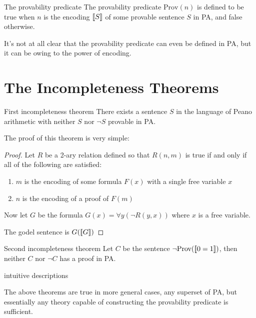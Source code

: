 \documentclass[12pt]{article}
\DeclarePairedDelimiter{\enc}{[\![}{]\!]}
\newcommand{\prov}{\text{Prov}}
\begin{document}
	\begin{definition}{The provability predicate}{}
		The provability predicate $\prov(n)$ is defined to be true when $n$ is the encoding $\enc{S}$ of some provable sentence $S$ in PA, and false otherwise.
	\end{definition}
	
	It's not at all clear that the provability predicate can even be defined in PA, but it can be owing to the power of encoding.
	
	\section{The Incompleteness Theorems}
	
	\begin{theorem}{First incompleteness theorem}{}
		There exists a sentence $S$ in the language of Peano arithmetic with neither $S$ nor $\lnot S$ provable in PA.
	\end{theorem}

	The proof of this theorem is very simple:
	
	\begin{proof}
		Let $R$ be a 2-ary relation defined so that $R(n,m)$ is true if and only if all of the following are satisfied:
		\begin{enumerate}[itemsep=0pt]
			\item $m$ is the encoding of some formula $F(x)$ with a single free variable $x$
			\item $n$ is the encoding of a proof of $F(m)$
		\end{enumerate}
		
		\noindent Now let $G$ be the formula $G(x) = \forall y (\lnot R(y, x))$ where $x$ is a free variable.
		
		The godel sentence is $G(\enc{G})$ 
	\end{proof}

	\begin{theorem}{Second incompleteness theorem}{}
		Let $C$ be the sentence $\lnot\prov(\enc{0=1})$, then neither $C$ nor $\lnot C$ has a proof in PA.		
	\end{theorem}

	\begin{tcolorbox}[colback=red!5!white,colframe=red!75!black,title=TODO]
		intuitive descriptions
	\end{tcolorbox}

	The above theorems are true in more general cases, any superset of PA, but essentially any theory capable of constructing the provability predicate is sufficient.
	
\end{document}
